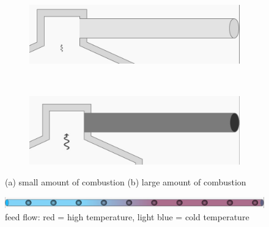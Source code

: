 \begin{figure}[ht]
    \centering
    \begin{subfigure}{1\textwidth}
        \centering
        \includegraphics[width=0.6\linewidth]{images/concept/elements/low_combustion_output.jpg}
        \caption{}
    \end{subfigure}
    \\[\baselineskip]
    \begin{subfigure}{1\textwidth}
        \centering
        \includegraphics[width=0.6\linewidth]{images/concept/elements/high_combustion_output.jpg}
        \caption{}
    \end{subfigure}
    \caption { (a) small amount of combustion  (b) large amount of combustion}
\label{fig:appendix_combustion_product}
\end{figure}

 \begin{figure}[htp]
    \centering
    \includegraphics[width=0.9\linewidth]{images/concept/elements/flow_pipe.jpg}
    \caption {feed flow: red = high temperature, light blue = cold temperature}
\label{fig:appendix_flow_pipe}
\end{figure}


